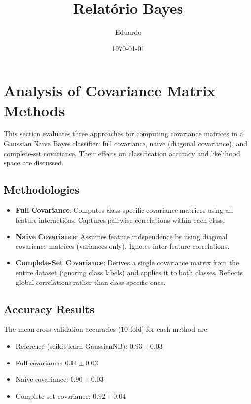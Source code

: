 \documentclass[a4paper,12pt]{article}
\begin{document}
\title{Relatório Bayes}
\author{Eduardo}
\date{\today}
\maketitle

\section{Analysis of Covariance Matrix Methods}
\label{sec:covariance_analysis}

This section evaluates three approaches for computing covariance matrices in a Gaussian Naive Bayes classifier: full covariance, naive (diagonal covariance), and complete-set covariance. Their effects on classification accuracy and likelihood space are discussed.

\subsection{Methodologies}
\begin{itemize}
  \item \textbf{Full Covariance}: Computes class-specific covariance matrices using all feature interactions. Captures pairwise correlations within each class.
  \item \textbf{Naive Covariance}: Assumes feature independence by using diagonal covariance matrices (variances only). Ignores inter-feature correlations.
  \item \textbf{Complete-Set Covariance}: Derives a single covariance matrix from the entire dataset (ignoring class labels) and applies it to both classes. Reflects global correlations rather than class-specific ones.
\end{itemize}

\subsection{Accuracy Results}
The mean cross-validation accuracies (10-fold) for each method are:
\begin{itemize}
  \item Reference (scikit-learn GaussianNB): \(0.93 \pm 0.03\)
  \item Full covariance: \(0.94 \pm 0.03\)
  \item Naive covariance: \(0.90 \pm 0.03\)
  \item Complete-set covariance: \(0.92 \pm 0.04\)
\end{itemize}
\end{document}
